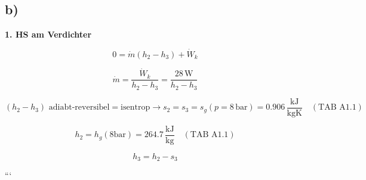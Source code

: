 

\subsection*{b)}

\textbf{1. HS am Verdichter}

\[
0 = \dot{m} (h_2 - h_3) + \dot{W}_k
\]

\[
\dot{m} = \frac{\dot{W}_k}{h_2 - h_3} = \frac{28 \, \text{W}}{h_2 - h_3}
\]

\[
(h_2 - h_3) \text{ adiabt-reversibel} = \text{isentrop} \rightarrow s_2 = s_3 = s_g (p = 8 \, \text{bar}) = 0.906 \, \frac{\text{kJ}}{\text{kgK}} \quad (\text{TAB A1.1})
\]

\[
h_2 = h_g (\text{8bar}) = 264.7 \, \frac{\text{kJ}}{\text{kg}} \quad (\text{TAB A1.1})
\]

\[
h_3 = h_2 - s_3
\]

```